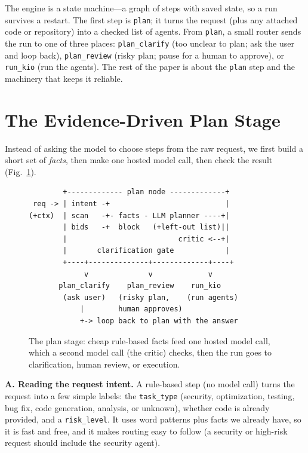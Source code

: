 \documentclass[conference]{IEEEtran}
\begin{document}
The engine is a state machine---a graph of steps with saved state, so a run
survives a restart. The first step is \texttt{plan}; it turns the request (plus any
attached code or repository) into a checked list of agents. From \texttt{plan}, a
small router sends the run to one of three places: \texttt{plan\_clarify} (too
unclear to plan; ask the user and loop back), \texttt{plan\_review} (risky plan;
pause for a human to approve), or \texttt{run\_kio} (run the agents). The rest of
the paper is about the \texttt{plan} step and the machinery that keeps it reliable.

\section{The Evidence-Driven Plan Stage}
\label{sec:plan}
Instead of asking the model to choose steps from the raw request, we first build a
short set of \emph{facts}, then make one hosted model call, then check the result
(Fig.~\ref{fig:stage}).

\begin{figure}[t]
\centering
\footnotesize
\begin{verbatim}
        +------------- plan node -------------+
 req -> | intent -+                           |
(+ctx)  | scan   -+- facts - LLM planner ----+|
        | bids   -+  block   (+left-out list)||
        |                          critic <--+|
        |       clarification gate            |
        +----+--------------+-------------+----+
             v              v             v
       plan_clarify    plan_review    run_kio
        (ask user)   (risky plan,    (run agents)
            |        human approves)
            +-> loop back to plan with the answer
\end{verbatim}
\caption{The plan stage: cheap rule-based facts feed one hosted model call, which a
second model call (the critic) checks, then the run goes to clarification, human
review, or execution.}
\label{fig:stage}
\end{figure}

\textbf{A. Reading the request intent.} A rule-based step (no model call) turns the
request into a few simple labels: the \texttt{task\_type} (security, optimization,
testing, bug fix, code generation, analysis, or unknown), whether code is already
provided, and a \texttt{risk\_level}. It uses word patterns plus facts we already
have, so it is fast and free, and it makes routing easy to follow (a security or
high-risk request should include the security agent).
\end{document}
